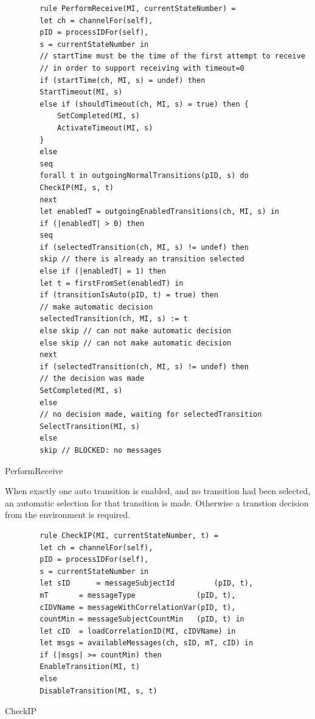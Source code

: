 \begin{listing}[H]
	\begin{verbatim}
		rule PerformReceive(MI, currentStateNumber) =
		let ch = channelFor(self),
		pID = processIDFor(self),
		s = currentStateNumber in
		// startTime must be the time of the first attempt to receive
		// in order to support receiving with timeout=0
		if (startTime(ch, MI, s) = undef) then
		StartTimeout(MI, s)
		else if (shouldTimeout(ch, MI, s) = true) then {
			SetCompleted(MI, s)
			ActivateTimeout(MI, s)
		}
		else
		seq
		forall t in outgoingNormalTransitions(pID, s) do
		CheckIP(MI, s, t)
		next
		let enabledT = outgoingEnabledTransitions(ch, MI, s) in
		if (|enabledT| > 0) then
		seq
		if (selectedTransition(ch, MI, s) != undef) then
		skip // there is already an transition selected
		else if (|enabledT| = 1) then
		let t = firstFromSet(enabledT) in
		if (transitionIsAuto(pID, t) = true) then
		// make automatic decision
		selectedTransition(ch, MI, s) := t
		else skip // can not make automatic decision
		else skip // can not make automatic decision
		next
		if (selectedTransition(ch, MI, s) != undef) then
		// the decision was made
		SetCompleted(MI, s)
		else
		// no decision made, waiting for selectedTransition
		SelectTransition(MI, s)
		else
		skip // BLOCKED: no messages
	\end{verbatim}
	\caption{PerformReceive}
	\label{lst:shortasm:PerformReceive}
\end{listing}

When exactly one auto transition is enabled, and no transition had been selected, an
automatic selection for that transition is made. Otherwise a transtion decision from
the environment is required.

\begin{listing}[H]
	\begin{verbatim}
		rule CheckIP(MI, currentStateNumber, t) =
		let ch = channelFor(self),
		pID = processIDFor(self),
		s = currentStateNumber in
		let sID      = messageSubjectId         (pID, t),
		mT       = messageType              (pID, t),
		cIDVName = messageWithCorrelationVar(pID, t),
		countMin = messageSubjectCountMin   (pID, t) in
		let cID  = loadCorrelationID(MI, cIDVName) in
		let msgs = availableMessages(ch, sID, mT, cID) in
		if (|msgs| >= countMin) then
		EnableTransition(MI, t)
		else
		DisableTransition(MI, s, t)
	\end{verbatim}
	\caption{CheckIP}
	\label{lst:shortasm:CheckIP}
\end{listing}

